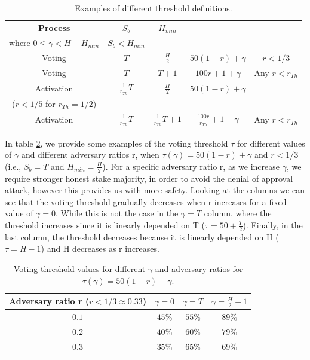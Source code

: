 \begin{table}[h!]
	\centering
	\begin{tabular}{ | c | c | c | c | c |} 
		\hline
		\textbf{Process} & $S_b$ & $H_{min}$ & \makecell[l]{$\tau(\gamma) = 
		H_{min} + \gamma$,\\ where $0 \leq \gamma < H-H_{min}$} & $S_b < 
		H_{min}$ \\ 
		\hline
		Voting & $T$ & $\frac{H}{2}$ & 
		$50(1-r)+\gamma$ & $r < 1/3$
		 \\ 
		Voting & $T$ & $T+1$ & $100r + 1 +\gamma$ & Any $r < r_{Th}$ \\ 
		\hline
		Activation & $\frac{1}{r_{Th}}T$ & $\frac{H}{2}$ & $50(1-r)+\gamma$ & 
		\makecell[c]{$r < \frac{r_{Th}}{2+r_{Th}}$ \\ ($r < 1/5$ for 
		$r_{Th} = 1/2$)}
		\\ 
		Activation & $\frac{1}{r_{Th}}T$ & $\frac{1}{r_{Th}}T + 1$ & 
		$\frac{100r}{r_{Th}} + 1 + \gamma$ & Any $r < r_{Th}$ \\ 
		\hline
	\end{tabular}
	\caption{Examples of different threshold definitions.}
	\label{table:threshold_examples}
\end{table}

In table \ref{table:examples}, we provide some examples of the voting threshold 
$\tau$ for different values of $\gamma$ and different adversary ratios r, when 
$\tau(\gamma) = 50(1-r)+\gamma$ and $r < 1/3$ (i.e., $S_b = T$ and $H_{min} = 
\frac{H}{2}$). For a specific adversary ratio r, as we increase $\gamma$, we 
require stronger honest stake majority, in order to avoid the denial of 
approval attack, however this provides us with more safety. Looking 
at the columns we can see that the voting threshold gradually decreases when r 
increases for a fixed value of $\gamma = 0$. While this is not the case in the 
$\gamma = T$ column, where the threshold increases since it is linearly 
depended on T ($\tau = 50 + \frac{T}{2}$). Finally, in the last column, the 
threshold decreases because it is linearly depended on H ($\tau = H - 1$) and 
H decreases as r increases.

\begin{table}[h!]
	\centering
	\begin{tabular}{ | c | c | c | c |} 
		\hline
		Adversary ratio r ($r < 1/3 \approx 0.33$) & $\gamma = 0$ & $\gamma = 
		T$ & $\gamma = \frac{H}{2} - 1$ \\ 
		\hline
		$0.1$ & $45\%$ & $55\%$ & $89\%$ \\ 
		$0.2$ & $40\%$ & $60\%$ & $79\%$ \\ 
		$0.3$ & $35\%$ & $65\%$ & $69\%$ \\ 
		\hline
	\end{tabular}
	\caption{Voting threshold values for different $\gamma$ and adversary 
		ratios for $\tau(\gamma) = 50(1-r)+\gamma$.}
	\label{table:examples}
\end{table}

